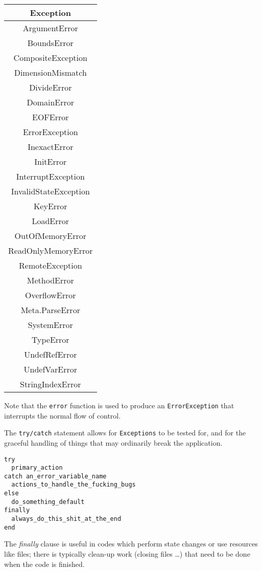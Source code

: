\documentclass[
]{article}
\begin{document}
\begin{longtable}[]{@{}c@{}}
\toprule\noalign{}
Exception \\
\midrule\noalign{}
\endhead
\bottomrule\noalign{}
\endlastfoot
ArgumentError \\
BoundsError \\
CompositeException \\
DimensionMismatch \\
DivideError \\
DomainError \\
EOFError \\
ErrorException \\
InexactError \\
InitError \\
InterruptException \\
InvalidStateException \\
KeyError \\
LoadError \\
OutOfMemoryError \\
ReadOnlyMemoryError \\
RemoteException \\
MethodError \\
OverflowError \\
Meta.ParseError \\
SystemError \\
TypeError \\
UndefRefError \\
UndefVarError \\
StringIndexError \\
\end{longtable}

Note that the \texttt{error} function is used to produce an
\texttt{ErrorException} that interrupts the normal flow of control.

The \texttt{try/catch} statement allows for \texttt{Exceptions} to be
tested for, and for the graceful handling of things that may ordinarily
break the application.

\begin{verbatim}
try
  primary_action
catch an_error_variable_name
  actions_to_handle_the_fucking_bugs
else
  do_something_default
finally
  always_do_this_shit_at_the_end
end
\end{verbatim}

The \emph{finally} clause is useful in codes which perform state changes
or use resources like files; there is typically clean-up work (closing
files \ldots) that need to be done when the code is finished.
\end{document}
